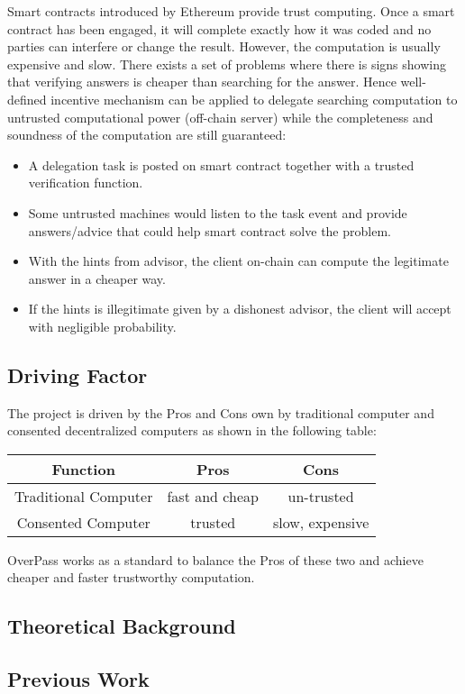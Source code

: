Smart contracts introduced by Ethereum \cite{wood2014ethereum} provide trust computing. Once a smart contract has been engaged, it will complete exactly how it was coded and no parties can interfere or change the result. However, the computation is usually expensive and slow. There exists a set of problems where there is signs showing that verifying answers is cheaper than searching for the answer. Hence well-defined incentive mechanism can be applied to delegate searching computation to untrusted computational power (off-chain server) while the completeness and soundness of the computation are still guaranteed:
\begin{itemize}
    \item  A delegation task is posted on smart contract together with a trusted verification function.
    \item  Some untrusted machines would listen to the task event and provide answers/advice that could help smart contract solve the problem.
    \item With the hints from advisor, the client on-chain can compute the legitimate answer in a cheaper way.
    \item If the hints is illegitimate given by a dishonest advisor, the client will accept with negligible probability.
\end{itemize}

\subsection{Driving Factor}
The project is driven by the Pros and Cons own by traditional computer and consented decentralized computers as shown in the following table:
\begin{footnotesize}
\begin{table}[H]
\begin{tabular}{|c|c|c|}
\hline
Function             & Pros           & Cons            \\ \hline
Traditional Computer & fast and cheap & un-trusted      \\ \hline
Consented Computer   & trusted        & slow, expensive \\ \hline
\end{tabular}
\end{table}
\end{footnotesize}
OverPass works as a standard to balance the Pros of these two and achieve cheaper and faster trustworthy computation.
\subsection{Theoretical Background} \label{theory}


\subsection{Previous Work} \label{ch:previous}

